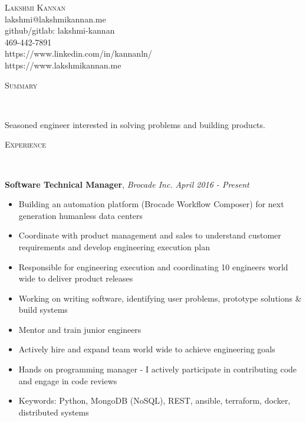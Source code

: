 \documentclass[9pt]{article}
\newenvironment{changemargin}[2]{%
  \begin{list}{}{%
    \setlength{\topsep}{0pt}%
    \setlength{\leftmargin}{#1}%
    \setlength{\rightmargin}{#2}%
    \setlength{\listparindent}{\parindent}%
    \setlength{\itemindent}{\parindent}%
    \setlength{\parsep}{\parskip}%
  }%
  \item[]}{\end{list}
}
\newcommand{\lineover}{
	\begin{changemargin}{-0.05in}{-0.05in}
		\vspace*{-8pt}
		\hrulefill \\
		\vspace*{-2pt}
	\end{changemargin}
}
\newcommand{\header}[1]{
	\begin{changemargin}{-0.5in}{-0.5in}
		\scshape{#1}\\
  	\lineover
	\end{changemargin}
}
\newcommand{\contact}[6]{
	\begin{changemargin}{-0.5in}{-0.5in}
		\begin{center}
			{\Large \scshape {#1}}\\ \smallskip
			{#2}\\ \smallskip
			{#3}\\ \smallskip
      {#4}\\ \smallskip
			{#5}\\ \smallskip
			{#6}\smallskip
		\end{center}
	\end{changemargin}
}
\newenvironment{body} {
	\vspace*{-16pt}
	\begin{changemargin}{-0.25in}{-0.5in}
  }
	{\end{changemargin}
}
\begin{document}
\contact{Lakshmi Kannan}{lakshmi@lakshmikannan.me}{github/gitlab: lakshmi-kannan}{469-442-7891}{https://www.linkedin.com/in/kannanln/}{https://www.lakshmikannan.me}

\header{Summary}

\begin{body}
	\vspace{14pt}
	Seasoned engineer interested in solving problems and building products. 
\end{body}

\smallskip


\header{Experience}

\begin{body}
    \vspace{20pt}
    \textbf{Software Technical Manager}, \emph{Brocade Inc.} \hfill \emph{April 2016 - Present}\\
    \begin{itemize} \itemsep -0pt  %
    \item Building an automation platform (Brocade Workflow Composer) for next generation humanless data centers
    \item Coordinate with product management and sales to understand customer requirements and develop engineering execution plan
    \item Responsible for engineering execution and coordinating 10 engineers world wide to deliver product releases
    \item Working on writing software, identifying user problems, prototype solutions \& build systems
    \item Mentor and train junior engineers
    \item Actively hire and expand team world wide to achieve engineering goals
    \item Hands on programming manager - I actively participate in contributing code and engage in code reviews 
    \item Keywords: Python, MongoDB (NoSQL), REST, ansible, terraform, docker, distributed systems
    \end{itemize}


\end{body}
\end{document}
